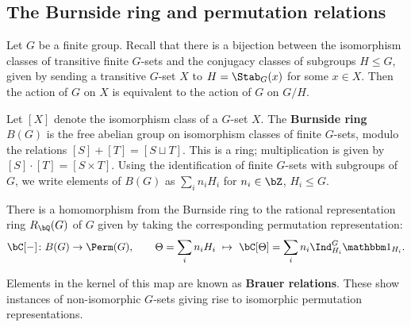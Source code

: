 
\subsection{The Burnside ring and \color{red} permutation relations}

Let $G$ be a finite group. Recall that there is a bijection between the isomorphism classes of transitive finite $G$-sets and the conjugacy classes of subgroups $H \leq G$, given by sending a transitive $G$-set $X$ to $H = \Stab_{G}(x)$ for some $x \in X$. Then the action of $G$ on $X$ is equivalent to the action of $G$ on $G / H$. 

\begin{defn}
Let $[X]$ denote the isomorphism class of a $G$-set $X$. 
The \textbf{Burnside ring} $B(G)$ is the free abelian group on isomorphism classes of finite $G$-sets, modulo the relations  $[S] + [T] = [S \sqcup T]$. This is a ring; multiplication is given by $[S] \cdot [T] = [S \times T]$. Using the identification of finite $G$-sets with subgroups of $G$, we write elements of $B(G)$ as $\sum_i n_i H_i$ for $n_i \in \bZ$, $H_i \leq G$. 
\end{defn}

\begin{notn}
There is a homomorphism from the Burnside ring to the rational representation ring $R_{\bQ}(G)$ of $G$ given by taking the corresponding permutation representation:
\[ \bC[-] \colon B(G) \to \Perm(G),  \qquad \Theta = \sum_i n_i H_i \ \mapsto \ \bC[\Theta ] = \sum_i n_i \Ind_{H_i}^G \trivial_{H_i}. \]
\end{notn}
Elements in the kernel of this map are known as \textbf{Brauer relations}. These show instances of non-isomorphic $G$-sets giving rise to isomorphic permutation representations. 

